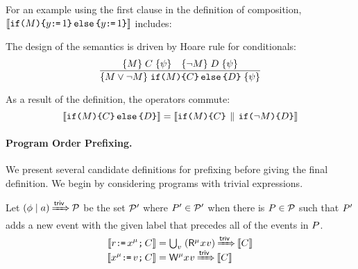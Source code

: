 For an example using the first clause in the definition of composition,
 $\llbracket\texttt{if}\allowbreak\texttt{(}M\texttt{)}\allowbreak\texttt{\{} y\texttt{:}\mkern-1mu\texttt{=}\,1 \texttt{\}}\,\allowbreak\texttt{else}\allowbreak\,\texttt{\{} y\texttt{:}\mkern-1mu\texttt{=}\,1\texttt{\}}\rrbracket$ includes:
\begin{tikzdisplay}[node distance=1em]
\end{tikzdisplay}

The design of the semantics is driven by Hoare rule for conditionals:
\begin{displaymath}
  \frac{
    \{M\}\allowbreak\;C\;\allowbreak\{\psi\}
    \quad
    \{\lnot M\}\allowbreak\;D\;\allowbreak\{\psi\}
  }{
    \{M\lor \lnot M\}\allowbreak\;\texttt{if}\allowbreak\texttt{(}M\texttt{)}\allowbreak\texttt{\{} C \texttt{\}}\,\allowbreak\texttt{else}\allowbreak\,\texttt{\{} D\texttt{\}}\;\allowbreak\{\psi\}
  }
\end{displaymath}

As a result of the definition, the operators commute:
\begin{displaymath}
  \llbracket\texttt{if}\allowbreak\texttt{(}M\texttt{)} \allowbreak\texttt{\{} C \texttt{\}}\,\allowbreak\texttt{else}\allowbreak\,\texttt{\{} D \texttt{\}}\rrbracket
  =
  \llbracket\texttt{if}\allowbreak\texttt{(}M\texttt{)} \allowbreak\texttt{\{} C \texttt{\}} \,\mathbin{\|}\, \texttt{if}\allowbreak\texttt{(}\lnot M\texttt{)} \allowbreak\texttt{\{} D \texttt{\}}\rrbracket
\end{displaymath}


\paragraph{Program Order Prefixing.} %
We present several candidate definitions for prefixing before giving the
final definition.  We begin by considering programs with trivial expressions.

\begin{candidate}
  \label{def:rw:sc1}
  Let $(\phi \mid a) \mathbin{{\xRightarrow{{\mathsf{triv}}}}} \mathcal{P}$ be the set $\mathcal{P}'$ where
  $P'\in\mathcal{P}'$ when there is $P\in\mathcal{P}$ such that $P'$ adds a
  new event with the given label that precedes all of the events in $P$.
  \begin{align*}
    \sem{\aReg\GETS\aLoc^\amode\SEMI \aCmd} & =
    \smash{\textstyle\bigcup_\aVal\; (\DRmode\aLoc\aVal) \prefixsimp \sem{\aCmd}}
    \\
    \sem{\aLoc^\amode\GETS\aVal\SEMI \aCmd} & =
    \smash{\DWmode\aLoc\aVal \prefixsimp \sem{\aCmd}}
  \end{align*}
\end{candidate}

